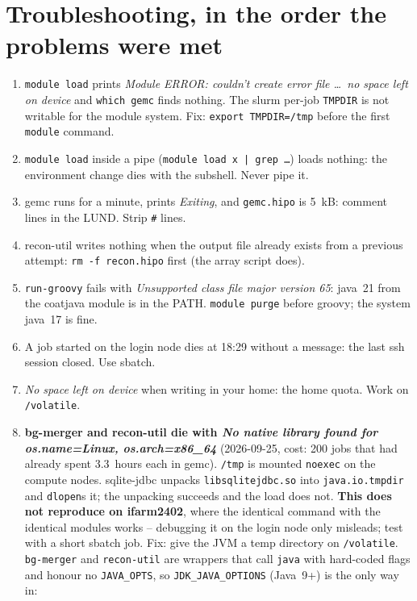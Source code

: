 \documentclass[11pt]{article}
\begin{document}
\section{Troubleshooting, in the order the problems were met}
\begin{enumerate}
\item \texttt{module load} prints \emph{Module ERROR: couldn't create error file \dots\ no space left on
  device} and \texttt{which gemc} finds nothing. The slurm per-job \texttt{TMPDIR} is not writable
  for the module system. Fix: \texttt{export TMPDIR=/tmp} before the first \texttt{module} command.
\item \texttt{module load} inside a pipe (\texttt{module load x | grep \dots}) loads nothing: the
  environment change dies with the subshell. Never pipe it.
\item gemc runs for a minute, prints \emph{Exiting}, and \texttt{gemc.hipo} is 5~kB: comment lines in
  the LUND. Strip \texttt{\#} lines.
\item recon-util writes nothing when the output file already exists from a previous attempt:
  \texttt{rm -f recon.hipo} first (the array script does).
\item \texttt{run-groovy} fails with \emph{Unsupported class file major version 65}: java~21 from the
  coatjava module is in the PATH. \texttt{module purge} before groovy; the system java~17 is fine.
\item A job started on the login node dies at 18:29 without a message: the last ssh session
  closed. Use sbatch.
\item \emph{No space left on device} when writing in your home: the home quota. Work on
  \texttt{/volatile}.
\item \textbf{bg-merger and recon-util die with \emph{No native library found for
  os.name=Linux, os.arch=x86\_64}} (2026-09-25, cost: 200 jobs that had already spent
  3.3~hours each in gemc). \texttt{/tmp} is mounted \texttt{noexec} on the compute nodes.
  sqlite-jdbc unpacks \texttt{libsqlitejdbc.so} into \texttt{java.io.tmpdir} and
  \texttt{dlopen}s it; the unpacking succeeds and the load does not. \textbf{This does not
  reproduce on ifarm2402}, where the identical command with the identical modules works --
  debugging it on the login node only misleads; test with a short sbatch job. Fix: give the
  JVM a temp directory on \texttt{/volatile}. \texttt{bg-merger} and \texttt{recon-util} are
  wrappers that call \texttt{java} with hard-coded flags and honour no \texttt{JAVA\_OPTS},
  so \texttt{JDK\_JAVA\_OPTIONS} (Java~9+) is the only way in:

\end{enumerate}
\end{document}
